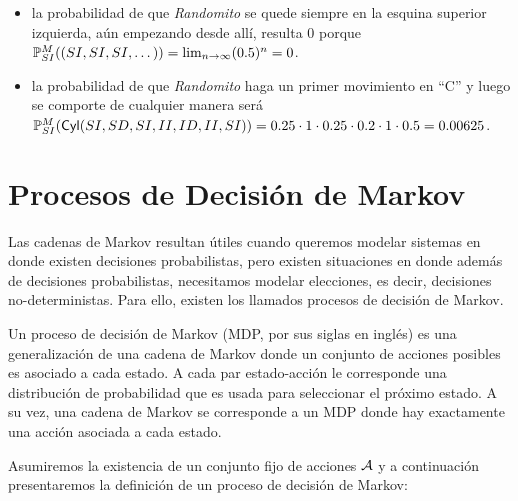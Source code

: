 \begin{itemize}
	\item la probabilidad de que \emph{Randomito} se quede siempre en la esquina superior
	      izquierda, aún empezando desde allí, resulta 0 porque $\mathbb{P}^M_{SI}((SI, SI,
		      SI, \dots)) = \lim_{n\to \infty} (0.5)^n = 0$.
	\item la probabilidad de que \emph{Randomito} haga un primer movimiento en ``C'' y
	      luego se comporte de cualquier manera será $\mathbb{P}^M_{SI}(\textsf{Cyl}(SI, SD, SI, II,
		      ID, II, SI)) = 0.25 \cdot 1 \cdot 0.25 \cdot 0.2 \cdot 1 \cdot 0.5 = 0.00625$.
\end{itemize}



\section{Procesos de Decisión de Markov}

Las cadenas de Markov resultan útiles cuando queremos modelar sistemas en donde
existen decisiones probabilistas, pero existen situaciones en donde además de
decisiones probabilistas, necesitamos modelar elecciones, es decir, decisiones
no-deterministas. Para ello, existen los llamados procesos de decisión de
Markov.

Un proceso de decisión de Markov (MDP, por sus siglas en inglés) es una
generalización de una cadena de Markov donde un conjunto de acciones posibles
es asociado a cada estado. A cada par estado-acción le corresponde una
distribución de probabilidad que es usada para seleccionar el próximo estado. A
su vez, una cadena de Markov se corresponde a un MDP donde hay exactamente una
acción asociada a cada estado.

Asumiremos la existencia de un conjunto fijo de acciones $\mathcal{A}$ y a
continuación presentaremos la definición de un proceso de decisión de Markov:

